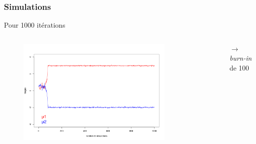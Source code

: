 \begin{frame}
    \frametitle{Simulations} 
    \centering
    \small Pour 1000 itérations
    \vspace{0cm}
    \begin{columns}
        \begin{column}{0.8\textwidth}
            \begin{figure}
                \includegraphics[width=0.8\textwidth]{../MCMC_numeric/simu_gaussian/mu.png} 
            \end{figure}
            
        \end{column}
        \begin{column}{0.2\textwidth}
            \centering
            $\rightarrow$ \textit{burn-in} de 100
        \end{column}
    \end{columns}
    \end{frame}


